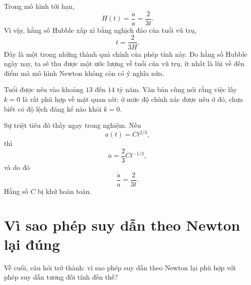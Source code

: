 Trong mô hình tới hạn,
\begin{equation}
H(t)=\frac{\dot a}{a}=\frac{2}{3t}.
\end{equation}
Vì vậy, hằng số Hubble xấp xỉ bằng nghịch đảo của tuổi vũ trụ,
\begin{equation}
t=\frac{2}{3H}.
\end{equation}
Đây là một trong những thành quả chính của phép tính này. Đo hằng số Hubble ngày nay, ta sẽ thu được một ước lượng về tuổi của vũ trụ, ít nhất là lùi về đến điểm mà mô hình Newton không còn có ý nghĩa nữa.

Tuổi được nêu vào khoảng \(13\) đến \(14\) tỷ năm. Văn bản cũng nói rằng việc lấy \(k=0\) là rất phù hợp về mặt quan sát: ở mức độ chính xác được nêu ở đó, chưa biết có độ lệch đáng kể nào khỏi \(k=0\).

\begin{classroomqa}
\end{classroomqa}

Sự triệt tiêu đó thấy ngay trong nghiệm. Nếu
\begin{equation}
a(t)=Ct^{2/3},
\end{equation}
thì
\begin{equation}
\dot a=\frac{2}{3}Ct^{-1/3},
\end{equation}
và do đó
\begin{equation}
\frac{\dot a}{a}=\frac{2}{3t}.
\end{equation}
Hằng số \(C\) bị khử hoàn toàn.

\section{Vì sao phép suy dẫn theo Newton lại đúng}

Về cuối, câu hỏi trở thành: vì sao phép suy dẫn theo Newton lại phù hợp với phép suy dẫn tương đối tính đến thế?

\begin{classroomqa}
\end{classroomqa}

